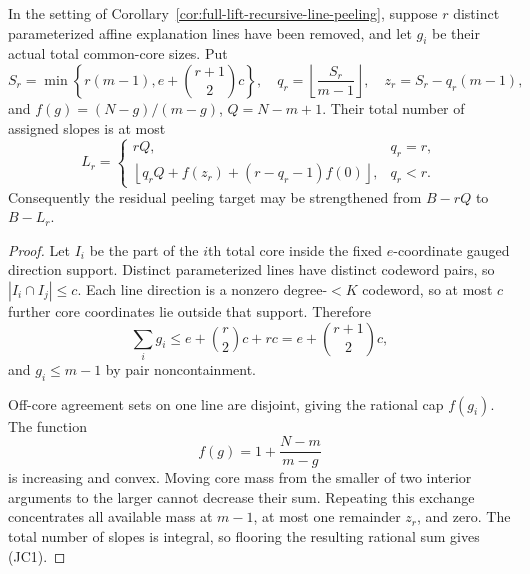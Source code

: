 \documentclass[11pt,a4paper]{amsart}
\numberwithin{equation}{section}
\theoremstyle{remark}
\begin{document}
\begin{corollary}
\label{cor:full-lift-joint-core-charge}
In the setting of
Corollary~\ref{cor:full-lift-recursive-line-peeling}, suppose \(r\)
distinct parameterized affine explanation lines have been removed, and let
\(g_i\) be their actual total common-core sizes.  Put
\[
 S_r=\min\left\{r(m-1),e+\binom{r+1}{2}c\right\},
 \quad q_r=\left\lfloor\frac{S_r}{m-1}\right\rfloor,
 \quad z_r=S_r-q_r(m-1),
\]
and \(f(g)=(N-g)/(m-g)\), \(Q=N-m+1\).  Their total number of assigned
slopes is at most
\[
 L_r=
 \begin{cases}
  rQ,&q_r=r,\\
  \left\lfloor
   q_rQ+f(z_r)+(r-q_r-1)f(0)
  \right\rfloor,&q_r<r.
 \end{cases}                                      \tag{JC1}
\]
Consequently the residual peeling target may be strengthened from
\(B-rQ\) to \(B-L_r\).
\end{corollary}

\begin{proof}
Let \(I_i\) be the part of the \(i\)th total core inside the fixed
\(e\)-coordinate gauged direction support.  Distinct parameterized lines
have distinct codeword pairs, so
\(|I_i\cap I_j|\le c\).  Each line direction is a nonzero degree-\(<K\)
codeword, so at most \(c\) further core coordinates lie outside that
support.  Therefore
\[
 \sum_i g_i\le e+\binom r2c+rc
              =e+\binom{r+1}{2}c,
\]
and \(g_i\le m-1\) by pair noncontainment.

Off-core agreement sets on one line are disjoint, giving the rational cap
\(f(g_i)\).  The function
\[
 f(g)=1+\frac{N-m}{m-g}
\]
is increasing and convex.  Moving core mass from the smaller of two
interior arguments to the larger cannot decrease their sum.  Repeating
this exchange concentrates all available mass at \(m-1\), at most one
remainder \(z_r\), and zero.  The total number of slopes is integral, so
flooring the resulting rational sum gives (JC1).
\end{proof}
\end{document}
